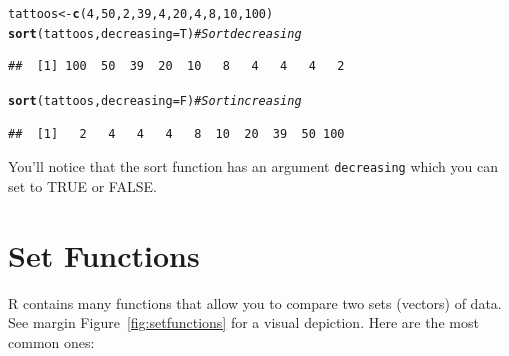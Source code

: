 \documentclass{tufte-book}\usepackage[]{graphicx}\usepackage[]{color}
\makeatletter
\newcommand{\hlnum}[1]{\textcolor[rgb]{0.686,0.059,0.569}{#1}}%
\newcommand{\hlcom}[1]{\textcolor[rgb]{0.678,0.584,0.686}{\textit{#1}}}%
\newcommand{\hlstd}[1]{\textcolor[rgb]{0.345,0.345,0.345}{#1}}%
\newcommand{\hlkwb}[1]{\textcolor[rgb]{0.69,0.353,0.396}{#1}}%
\newcommand{\hlkwc}[1]{\textcolor[rgb]{0.333,0.667,0.333}{#1}}%
\newcommand{\hlkwd}[1]{\textcolor[rgb]{0.737,0.353,0.396}{\textbf{#1}}}%
\newenvironment{kframe}{%
 \def\at@end@of@kframe{}%
 \ifinner\ifhmode%
  \def\at@end@of@kframe{\end{minipage}}%
  \begin{minipage}{\columnwidth}%
 \fi\fi%
 \def\FrameCommand##1{\hskip\@totalleftmargin \hskip-\fboxsep
 \colorbox{shadecolor}{##1}\hskip-\fboxsep
     \hskip-\linewidth \hskip-\@totalleftmargin \hskip\columnwidth}%
 \MakeFramed {\advance\hsize-\width
   \@totalleftmargin\z@ \linewidth\hsize
   \@setminipage}}%
 {\par\unskip\endMakeFramed%
 \at@end@of@kframe}
\newenvironment{knitrout}{}{} %
\makeatother
\begin{document}
\begin{knitrout}
\color{fgcolor}\begin{kframe}
\begin{alltt}
\hlstd{tattoos} \hlkwb{<-} \hlkwd{c}\hlstd{(}\hlnum{4}\hlstd{,} \hlnum{50}\hlstd{,} \hlnum{2}\hlstd{,} \hlnum{39}\hlstd{,} \hlnum{4}\hlstd{,} \hlnum{20}\hlstd{,} \hlnum{4}\hlstd{,} \hlnum{8}\hlstd{,} \hlnum{10}\hlstd{,} \hlnum{100}\hlstd{)}
\hlkwd{sort}\hlstd{(tattoos,} \hlkwc{decreasing} \hlstd{= T)} \hlcom{# Sort decreasing}
\end{alltt}
\begin{verbatim}
##  [1] 100  50  39  20  10   8   4   4   4   2
\end{verbatim}
\begin{alltt}
\hlkwd{sort}\hlstd{(tattoos,} \hlkwc{decreasing} \hlstd{= F)} \hlcom{# Sort increasing}
\end{alltt}
\begin{verbatim}
##  [1]   2   4   4   4   8  10  20  39  50 100
\end{verbatim}
\end{kframe}
\end{knitrout}


You'll notice that the sort function has an argument \texttt{decreasing} which you can set to TRUE or FALSE.


\section{Set Functions}

R contains many functions that allow you to compare two sets (vectors) of data. See margin Figure~\ref{fig:setfunctions} for a visual depiction. Here are the most common ones:
\end{document}
